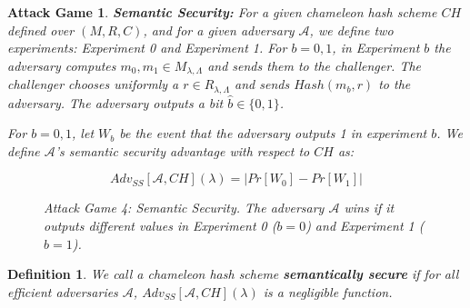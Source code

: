 \documentclass[a4paper]{article}
\newtheorem{definicao}{Definition}
\newtheorem{game}{Attack Game}
\begin{document}
 \begin{game}
 \textbf{Semantic Security: }For a given chameleon hash scheme $CH$
 defined over $(M, R, C)$, and for a given adversary $\mathcal{A}$,
 we define two experiments: Experiment 0 and Experiment 1. For $b=0,1$,
 in Experiment $b$ the adversary computes 
 $m_0, m_1 \in M_{\lambda,\Lambda}$ and sends them to the challenger.
 The challenger chooses uniformly a $r \in R_{\lambda,\Lambda}$
 and sends $Hash(m_b, r)$ to the adversary. The adversary outputs a
 bit $\hat b\in \{0,1\}$.
 
 For $b=0,1$, let $W_b$ be the event that the adversary outputs
 1 in experiment $b$. We define $\mathcal{A}$'s semantic security
 advantage with respect to $CH$ as:
 
 $$
 Adv_{SS}[\mathcal{A}, CH](\lambda) = |Pr[W_0]-Pr[W_1]|
 $$
 
 \begin{figure}
 \centering
 \caption{Attack Game 4: Semantic Security. The adversary $\mathcal{A}$ wins if it outputs different values in Experiment 0 ($b=0$) and Experiment 1 ($b=1$).}
 \end{figure}
 \end{game}
 
 \begin{definicao}
 We call a chameleon hash scheme \textbf{semantically secure} 
 if for all efficient adversaries $\mathcal{A}$,
 $Adv_{SS}[\mathcal{A},CH](\lambda)$ is a negligible function.
 \end{definicao}
 
\end{document}
